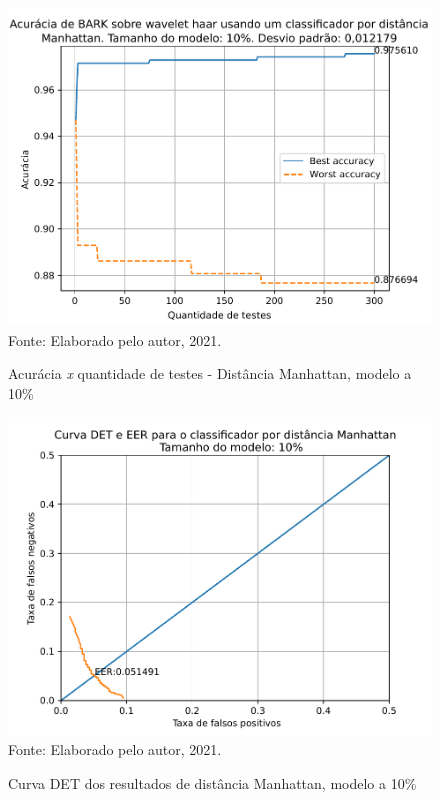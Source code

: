 			\begin{figure}[H]
				\centering
				\caption{Acurácia \textit{x} quantidade de testes - Distância Manhattan, modelo a 10\%}
				\includegraphics[width=.9\linewidth]{images/results/confusionMatrices/classifier_Manhattan_10}
				\label{fig:classifiermanhattan10}
				\\Fonte: Elaborado pelo autor, 2021.
			\end{figure}
		
			\begin{figure}[H]
				\centering
				\caption{Curva DET dos resultados de distância Manhattan, modelo a 10\%}
				\includegraphics[width=.9\linewidth]{images/results/det/DET_for_classifier_Manhattan_10}
				\label{fig:detforclassifiermanhattan10}
				\\Fonte: Elaborado pelo autor, 2021.
			\end{figure}
	
